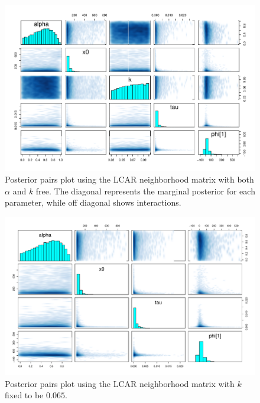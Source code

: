 \documentclass{scrartcl}
\begin{document}
\begin{figure}
  \centering
  \includegraphics[width=.9\linewidth]{pairs-full}
  \caption{Posterior pairs plot using the LCAR neighborhood matrix
    with both $\alpha$ and $k$ free. The diagonal represents the
    marginal posterior for each parameter, while off diagonal shows
    interactions.}
  \label{fig:pairs-full}
\end{figure}

\begin{figure}
  \centering
\includegraphics[width=.9\linewidth]{pairs-k-fixed}
  \caption{Posterior pairs plot using the LCAR neighborhood matrix
    with $k$ fixed to be $0.065$.}
  \label{fig:pairs-full}
\end{figure}
\end{document}
